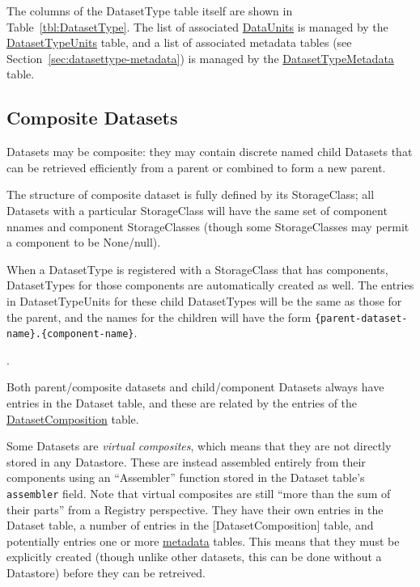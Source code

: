 \documentclass[DM,toc]{lsstdoc}
\newcommand{\tblref}[1]{\hyperref[tbl:#1]{#1}}
\newcommand{\coltable}[1]{
    \begin{table}[!htb]
        {\footnotesize
        }
        \caption{#1 Columns}
        \label{tbl:#1}
    \end{table}
}
\begin{document}
The columns of the DatasetType table itself are shown in Table~\ref{tbl:DatasetType}.
The list of associated \hyperref[sec:dataunits]{DataUnits} is managed by the \tblref{DatasetTypeUnits} table, and a list of associated metadata tables (see Section~\ref{sec:datasettype-metadata}) is managed by the \tblref{DatasetTypeMetadata} table.

\coltable{DatasetType}
\coltable{DatasetTypeUnits}
\coltable{DatasetTypeMetadata}


\subsection{Composite Datasets}
\label{sec:composite-datasets}

Datasets may be composite: they may contain discrete named child Datasets that can be retrieved efficiently from a parent or combined to form a new parent.

The structure of composite dataset is fully defined by its StorageClass; all Datasets with a particular StorageClass will have the same set of component nnames and component StorageClasses (though some StorageClasses may permit a component to be None/null).

When a DatasetType is registered with a StorageClass that has components, DatasetTypes for those components are automatically created as well.
The entries in DatasetTypeUnits for these child DatasetTypes will be the same as those for the parent, and the names for the children will have the form \texttt{\{parent-dataset-name\}.\{component-name\}}.

\coltable{DatasetComposition}.

Both parent/composite datasets and child/component Datasets always have entries in the Dataset table, and these are related by the entries of the \tblref{DatasetComposition} table.

Some Datasets are \emph{virtual composites}, which means that they are not
directly stored in any Datastore.
These are instead assembled entirely from their components using an ``Assembler'' function stored in the Dataset table's \texttt{assembler} field.
Note that virtual composites are still ``more than the sum of their parts'' from a Registry perspective.
They have their own entries in the Dataset table, a number of entries in the \tblref[DatasetComposition] table, and potentially entries one or more \hyperref[sec:metadata]{metadata} tables.
This means that they must be explicitly created (though unlike other datasets, this can be done without a Datastore) before they can be retreived.
\end{document}

